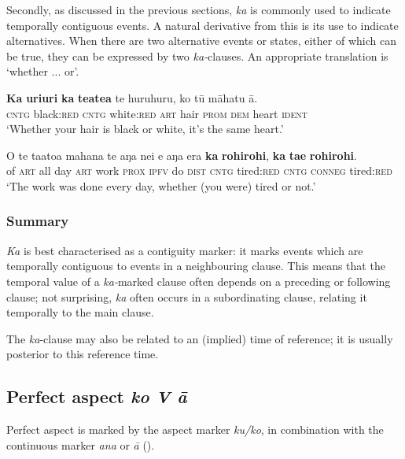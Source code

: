 Secondly, as discussed in the previous sections, \textit{ka} is commonly used to indicate temporally contiguous events. A natural derivative from this is its use to indicate alternatives. When there are two alternative events or states, either of which can be true, they can be expressed by two \textit{ka-}clauses. An appropriate translation is ‘whether ... or’.

\ea\label{ex:7.54}
\gll \textbf{Ka} \textbf{{\ꞌ}uri{\ꞌ}uri} \textbf{ka} \textbf{teatea} te huruhuru, ko tū māhatu {\ꞌ}ā. \\
\textsc{cntg} black:\textsc{red} \textsc{cntg} white:\textsc{red} \textsc{art} hair \textsc{prom} \textsc{dem} heart \textsc{ident} \\

\glt 
‘Whether your hair is black or white, it’s the same heart.’ \textstyleExampleref{[R211.078]} 
\z

\ea\label{ex:7.55}
\gll O te ta{\ꞌ}ato{\ꞌ}a mahana te aŋa nei e aŋa era \textbf{ka} \textbf{rohirohi},  \textbf{ka} \textbf{ta{\ꞌ}e} \textbf{rohirohi}.\\
of \textsc{art} all day \textsc{art} work \textsc{prox} \textsc{ipfv} do \textsc{dist} \textsc{cntg} tired:\textsc{red}  \textsc{cntg} \textsc{conneg} tired:\textsc{red}\\

\glt 
‘The work was done every day, whether (you were) tired or not.’ \textstyleExampleref{[R539-2.026]}
\z

\subsubsection{Summary}\label{sec:7.2.6.5}

\textit{Ka} is best characterised as a contiguity marker: it marks events which are temporally contiguous to events in a neighbouring clause. This means that the temporal value of a \textit{ka-}marked clause often depends on a preceding or following clause; not surprising, \textit{ka} often occurs in a subordinating clause, relating it temporally to the main clause.

The \textit{ka}{}-clause may also be related to an (implied) time of reference; it is usually posterior to this reference time. 
\subsection{Perfect aspect \textit{ko V {\ꞌ}ā}}\label{sec:7.2.7}
Perfect aspect is marked by the aspect marker \textit{ku/ko}, in combination with the continuous marker \textit{{\ꞌ}ana} or \textit{{\ꞌ}ā} (). 

